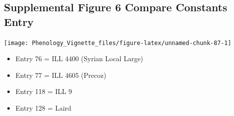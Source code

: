 \documentclass[
]{article}
\providecommand{\tightlist}{%
  \setlength{\itemsep}{0pt}\setlength{\parskip}{0pt}}
\begin{document}
\hypertarget{supplemental-figure-6-compare-constants-entry}{%
\subsection{Supplemental Figure 6 Compare Constants
Entry}\label{supplemental-figure-6-compare-constants-entry}}

\texttt{[image: Phenology\_Vignette\_files/figure-latex/unnamed-chunk-87-1]}

\begin{itemize}
\tightlist
\item
  Entry 76 = ILL 4400 (Syrian Local Large)
\item
  Entry 77 = ILL 4605 (Precoz)
\item
  Entry 118 = ILL 9
\item
  Entry 128 = Laird
\end{itemize}
\end{document}

